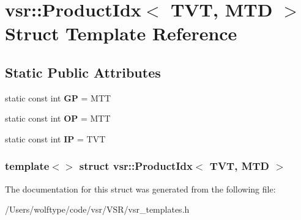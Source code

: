\hypertarget{structvsr_1_1_product_idx_3_01_t_v_t_00_01_m_t_d_01_4}{\section{vsr\-:\-:Product\-Idx$<$ T\-V\-T, M\-T\-D $>$ Struct Template Reference}
\label{structvsr_1_1_product_idx_3_01_t_v_t_00_01_m_t_d_01_4}
}
\subsection*{Static Public Attributes}
\begin{DoxyCompactItemize}
\item 
\hypertarget{structvsr_1_1_product_idx_3_01_t_v_t_00_01_m_t_d_01_4_add52b86dcbae32eaaea531c4ba297087}{static const int {\bfseries G\-P} = M\-T\-T}\label{structvsr_1_1_product_idx_3_01_t_v_t_00_01_m_t_d_01_4_add52b86dcbae32eaaea531c4ba297087}

\item 
\hypertarget{structvsr_1_1_product_idx_3_01_t_v_t_00_01_m_t_d_01_4_a011474cb3370c7fb3d1790f62deb8713}{static const int {\bfseries O\-P} = M\-T\-T}\label{structvsr_1_1_product_idx_3_01_t_v_t_00_01_m_t_d_01_4_a011474cb3370c7fb3d1790f62deb8713}

\item 
\hypertarget{structvsr_1_1_product_idx_3_01_t_v_t_00_01_m_t_d_01_4_a96ade2b965fef7cd1836766328d83c03}{static const int {\bfseries I\-P} = T\-V\-T}\label{structvsr_1_1_product_idx_3_01_t_v_t_00_01_m_t_d_01_4_a96ade2b965fef7cd1836766328d83c03}

\end{DoxyCompactItemize}
\subsubsection*{template$<$$>$ struct vsr\-::\-Product\-Idx$<$ T\-V\-T, M\-T\-D $>$}



The documentation for this struct was generated from the following file\-:\begin{DoxyCompactItemize}
\item 
/\-Users/wolftype/code/vsr/\-V\-S\-R/vsr\-\_\-templates.\-h\end{DoxyCompactItemize}
